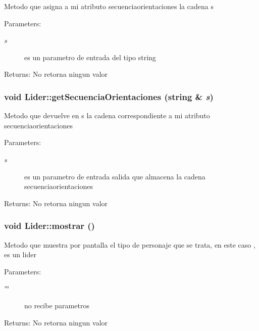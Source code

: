Metodo que asigna a mi atributo secuenciaorientaciones la cadena s \begin{Desc}
\item[Parameters:]
\begin{description}
\item[{\em s}]es un parametro de entrada del tipo string \end{description}
\end{Desc}
\begin{Desc}
\item[Returns:]No retorna ningun valor \end{Desc}
\hypertarget{classLider_38d5268d1d780494277063ce96c52881}{
\subsubsection[getSecuenciaOrientaciones]{\setlength{\rightskip}{0pt plus 5cm}void Lider::getSecuenciaOrientaciones (string \& {\em s})}}
\label{classLider_38d5268d1d780494277063ce96c52881}


Metodo que devuelve en s la cadena correspondiente a mi atributo secuenciaorientaciones \begin{Desc}
\item[Parameters:]
\begin{description}
\item[{\em s}]es un parametro de entrada salida que almacena la cadena secuenciaorientaciones \end{description}
\end{Desc}
\begin{Desc}
\item[Returns:]No retorna ningun valor \end{Desc}
\hypertarget{classLider_125acbb3a1432f217efdc9826a2b8d8f}{
\subsubsection[mostrar]{\setlength{\rightskip}{0pt plus 5cm}void Lider::mostrar ()}}
\label{classLider_125acbb3a1432f217efdc9826a2b8d8f}


Metodo que muestra por pantalla el tipo de personaje que se trata, en este caso , es un lider \begin{Desc}
\item[Parameters:]
\begin{description}
\item[{\em \char`\"{}\char`\"{}}]no recibe parametros \end{description}
\end{Desc}
\begin{Desc}
\item[Returns:]No retorna ningun valor \end{Desc}


